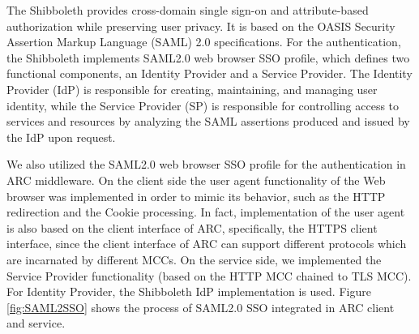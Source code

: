 \documentclass[twocolumn]{svjour3}         %
\begin{document}
The Shibboleth provides cross-domain single sign-on and attribute-based authorization while preserving user privacy. It is based on the OASIS Security Assertion Markup Language (SAML) 2.0 specifications. For the authentication, the Shibboleth implements SAML2.0 web browser SSO profile, which  defines two functional components, an Identity Provider and a Service Provider. The Identity Provider (IdP) is responsible for creating, maintaining, and managing user identity, while the Service Provider (SP) is responsible for controlling access to services and resources by analyzing the SAML assertions produced and issued by the IdP upon request.

We also utilized the SAML2.0 web browser SSO profile for the authentication in ARC middleware. On the client side the user agent functionality of the Web browser was implemented in order to mimic its behavior, such as the HTTP redirection and the Cookie processing. In fact, implementation of the user agent is also based on the client interface of ARC, specifically, the HTTPS client interface, since the client interface of ARC can support different protocols which are incarnated by different MCCs. On the service side, we implemented the Service Provider functionality (based on the HTTP MCC chained to TLS MCC). For Identity Provider, the Shibboleth IdP implementation is used. Figure \ref{fig:SAML2SSO} shows the process of SAML2.0 SSO integrated in ARC client and service.
\end{document}

